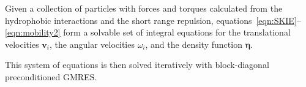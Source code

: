 \documentclass[lineno]{jfm}
\newcommand{\eeta}{\boldsymbol{\eta}}
\newcommand{\nnu}{\boldsymbol{\nu}}
\renewcommand{\vv}{\mathbf{v}}
\begin{document}
%
%
Given a collection of particles with forces and torques calculated from
the hydrophobic interactions and the short range repulsion,
equations~\eqref{eqn:SKIE}--\eqref{eqn:mobility2} form a solvable set of
integral equations for the translational velocities $\vv_i$, the angular
velocities $\omega_i$, and the density function $\eeta$. 


This system of equations is then solved iteratively with block-diagonal
preconditioned GMRES.
\end{document}
